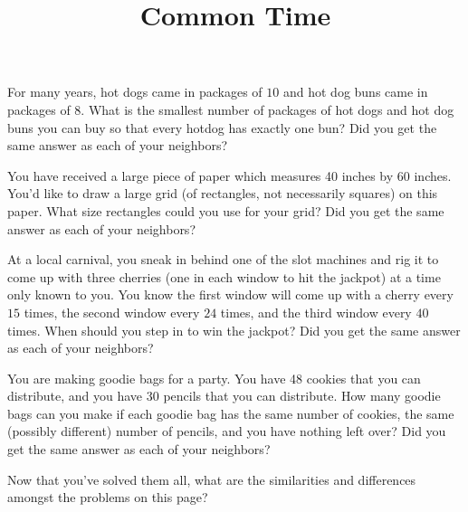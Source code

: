 \documentclass[nooutcomes, noauthor, handout]{ximera}
\title{Common Time}
\begin{document}
\begin{abstract}
\end{abstract}
\maketitle

\begin{problem}
For many years, hot dogs came in packages of $10$ and hot dog buns came in packages of $8$. What is the smallest number of packages of hot dogs  and hot dog buns you can buy so that every hotdog has exactly one bun? Did you get the same answer as each of your neighbors?

\end{problem}


\begin{problem}
You have received a large piece of paper which measures 40 inches by 60 inches.  You'd like to draw a large grid (of rectangles, not necessarily squares) on this paper.  What size rectangles could you use for your grid?  Did you get the same answer as each of your neighbors?
\vfill
\end{problem}


\begin{problem}
At a local carnival, you sneak in behind one of the slot machines and rig it to come up with three cherries (one in each window to hit the jackpot) at a time only known to you.  You know the first window will come up with a cherry every $15$ times, the second window every $24$ times, and the third window every $40$ times.  When should you step in to win the jackpot?  Did you get the same answer as each of your neighbors?
\vfill
\end{problem}





\begin{problem}
You are making goodie bags for a party. You have 48 cookies that you can distribute, and you have 30 pencils that you can distribute. How many goodie bags can you make if each goodie bag has the same number of cookies, the same (possibly different) number of pencils, and you have nothing left over? Did you get the same answer as each of your neighbors?

\end{problem}


\begin{problem}
Now that you've solved them all, what are the similarities and differences amongst the problems on this page?
\end{problem}
\end{document}
